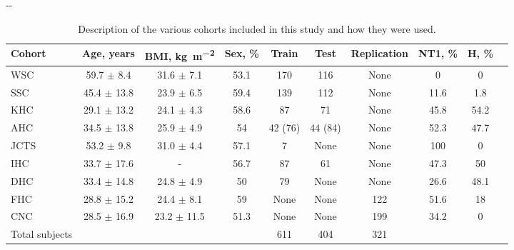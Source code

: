 \begin{table}[tb]
\begin{adjustwidth*}{}{-\marginparwidth-\marginparsep}
\small
\centering
\begin{threeparttable}  
\caption[\acs{STAGES} cohorts]{Description of the various cohorts included in this study and how they were used.}
\label{tab:classification-sleep-disorders:paper-iii:table-s01}
\begin{tabular}{@{}lccccccccc@{}}
    \toprule
    \textbf{Cohort}         & \textbf{Age}, years        & \textbf{BMI}, \si{\kilo\gram\per\meter\squared}        & \textbf{Sex}, \%       & \textbf{Train}  & \textbf{Test}              & \textbf{Replication}            & \textbf{\acs{NT1}}, \% & \textbf{H}, \% \\ \midrule
    \acs{WSC}            & 59.7 $ \pm $ 8.4  & 31.6 $ \pm $ 7.1  & 53.1      & 170                  & 116          & None        & 0        & 0 \\
    \acs{SSC}            & 45.4 $ \pm $ 13.8 & 23.9 $ \pm $ 6.5  & 59.4      & 139                  & 112          & None        & 11.6     & 1.8 \\
    \acs{KHC}            & 29.1 $ \pm $ 13.2 & 24.1 $ \pm $ 4.3  & 58.6      & 87                   & 71           & None        & 45.8     & 54.2 \\
    AHC            & 34.5 $ \pm $ 13.8 & 25.9 $ \pm $ 4.9  & 54        & 42 (76)         & 44 (84) & None        & 52.3     & 47.7 \\
    JCTS           & 53.2 $ \pm $ 9.8  & 31.0 $ \pm $ 4.4  & 57.1      & 7                    & None         & None        & 100      & 0 \\
    IHC            & 33.7 $ \pm $ 17.6 & -           & 56.7      & 87                   & 61           & None        & 47.3     & 50 \\
    DHC            & 33.4 $ \pm $ 14.8 & 24.8 $ \pm $ 4.9  & 50        & 79                   & None         & None        & 26.6     & 48.1 \\
    FHC            & 28.8 $ \pm $ 15.2 & 24.4 $ \pm $ 8.1  & 59        & None                 & None         & 122         & 51.6     & 18 \\
    CNC            & 28.5 $ \pm $ 16.9 & 23.2 $ \pm $ 11.5 & 51.3      & None                 & None         & 199         & 34.2     & 0 \\ \midrule
    Total subjects & & & & 611                  & 404          & 321         &          & \\

\end{tabular}
\end{threeparttable}
\end{adjustwidth*}
\end{table}

